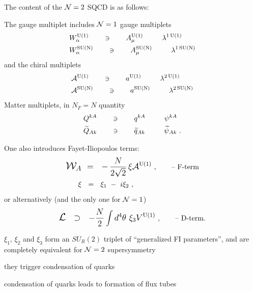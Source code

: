 \documentclass[12pt,letterpaper,landscape,KOMA,smallheadings,calcdimensions,display]{powersem}
\begin{document}
\begin{slide}
	The content of the $ \mathcal{N}=2 $ SQCD is as follows:

	The gauge multiplet includes $ \mathcal{N}=1 $ gauge multiplets
\begin{align*}
	&W_\alpha^{\rm U(1)}  \qquad\owns\qquad A_\mu^{\rm U(1)}~~\qquad  \lambda^{1\,\rm U(1)} \\
	&W_\alpha^{\rm SU(N)}	\qquad\owns\qquad A_\mu^{\rm SU(N)}~~\qquad \lambda^{1\, \rm SU(N)}
\end{align*}
	and the chiral multiplets
\begin{align*}
	&\mathcal{A}^{\rm U(1)}	\qquad\owns\qquad a^{\rm U(1)}~~\qquad \lambda^{2\,\rm U(1)} \\
	&\mathcal{A}^{\rm SU(N)}	\qquad\owns\qquad a^{\rm SU(N)}~~\qquad \lambda^{2\,\rm SU(N)}
\end{align*}
	Matter multiplets, in $ N_F = N $ quantity
\begin{align*}
	&Q^{kA}		\qquad\owns\qquad	q^{kA}~~\qquad   \psi^{kA} \\
	&\widetilde{Q}{}_{Ak}		\qquad\owns\qquad	\widetilde{q}_{Ak}~~\qquad  \widetilde{\psi}{}_{Ak}~.
\end{align*}

\end{slide}

\begin{slide}
	One also introduces Fayet-Iliopoulos terms:
\begin{align*}
	\mathlarger{\mathlarger{\mc{W}_A }} & 
		{\mathlarger{~~=~~ -\,\frac{N}{2\sqrt{2}}\,\xi\mc{A}^{\rm U(1)}}} ~,   
		\qquad \text{--  F-term} \\
	 \xi & ~~=~~ \xi_1 ~-~ i\xi_2~,
\end{align*}
	or alternatively (and the only one for $\mathcal{N}=1$)
\[
\mathlarger{
	\mathlarger{\mc{L}} ~~\supset~~  -\frac{N}{2} \int d^4\theta~ \xi_3 V^{\rm U(1)}
	}~, \qquad \text{-- D-term.}
\]
	
	$\xi_1$, $\xi_2$ and $\xi_3$ form an $SU_R(2)$ triplet of ``generalized FI parameters'', and
	are completely equivalent for $ \mathcal{N}=2 $ supersymmetry

	they trigger condensation of quarks

	condensation of quarks leads to formation of flux tubes
\end{slide}
\end{document}
